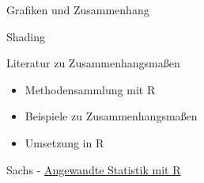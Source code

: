 \documentclass[ignorenonframetext,]{beamer}
\providecommand{\tightlist}{%
\setlength{\itemsep}{0pt}\setlength{\parskip}{0pt}}
\begin{document}
\begin{frame}[fragile]{Grafiken und Zusammenhang}
\begin{block}{Shading}
\end{block}

\begin{block}{Literatur zu Zusammenhangsmaßen}

\begin{itemize}
\tightlist
\item
  Methodensammlung mit R
\item
  Beispiele zu Zusammenhangsmaßen
\item
  Umsetzung in R
\end{itemize}

Sachs -
\href{https://books.google.de/books/about/Angewandte_Statistik.html?id=S-zXmAEACAAJ\&redir_esc=y}{Angewandte
Statistik mit R}

\end{block}

\end{frame}
\end{document}
